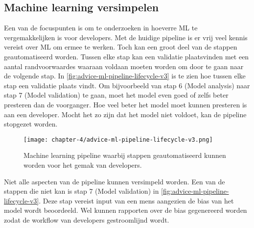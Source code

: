 \subsection{Machine learning versimpelen}\label{subsec:ch4-machine-learning-versimpelen}
Een van de focuspunten is om te onderzoeken in hoeverre ML te vergemakkelijken is voor developers. Met de huidige pipeline is er vrij veel kennis vereist over ML om ermee te werken. Toch kan een groot deel van de stappen geautomatiseerd worden. Tussen elke stap kan een validatie plaatsvinden met een aantal randvoorwaardes waaraan voldaan moeten worden om door te gaan naar de volgende stap. In \autoref{fig:advice-ml-pipeline-lifecycle-v3} is te zien hoe tussen elke stap een validatie plaats vindt. Om bijvoorbeeld van stap 6 (Model analysis) naar stap 7 (Model validation) te gaan, moet het model even goed of zelfs beter presteren dan de voorganger. Hoe veel beter het model moet kunnen presteren is aan een developer. Mocht het zo zijn dat het model niet voldoet, kan de pipeline stopgezet worden.

\newpage

\begin{figure}[hbt!]
  \centering
  \texttt{[image: chapter-4/advice-ml-pipeline-lifecycle-v3.png]}
  \caption{Machine learning pipeline waarbij stappen geautomatiseerd kunnen worden voor het gemak van developers.}
  \label{fig:advice-ml-pipeline-lifecycle-v3}
\end{figure}

Niet alle aspecten van de pipeline kunnen versimpeld worden. Een van de stappen die niet kan is stap 7 (Model validation) in \autoref{fig:advice-ml-pipeline-lifecycle-v3}. Deze stap vereist input van een mens aangezien de bias van het model wordt beoordeeld. Wel kunnen rapporten over de bias gegenereerd worden zodat de workflow van developers gestroomlijnd wordt.